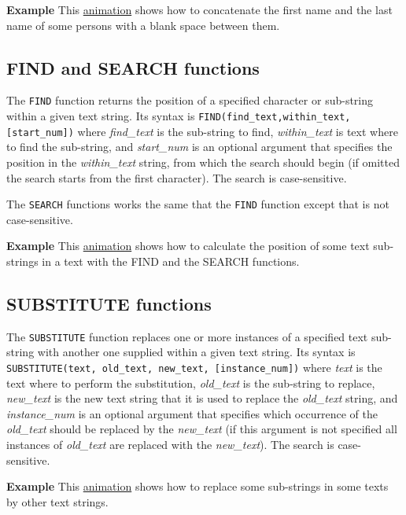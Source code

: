 \textbf{Example} This \href{http://aprendeconalf.es/office/excel/manual/img/example_function_concatenate.gif}{animation}
shows how to concatenate the first name and the last name of some persons with a blank space between them.


\subsection{FIND and SEARCH functions}\label{findandsearchfunctions}
The \texttt{FIND} function returns the position of a specified character or sub-string within a given text string. Its syntax is \texttt{FIND(find\_text,within\_text,[start\_num])} where \emph{find\_text} is the sub-string to find, \emph{within\_text} is text where to find the sub-string, and \emph{start\_num} is an optional argument that specifies the position in the \emph{within\_text} string, from which the search should begin (if omitted the search starts from the first character). The search is case-sensitive. 

The \texttt{SEARCH} functions works the same that the \texttt{FIND} function except that is not case-sensitive. 

\textbf{Example} This \href{http://aprendeconalf.es/office/excel/manual/img/example_function_find_search.gif}{animation}
shows how to calculate the position of some text sub-strings in a text with the FIND and the SEARCH functions.


\subsection{SUBSTITUTE functions}\label{substitutefunctions}
The \texttt{SUBSTITUTE} function replaces one or more instances of a specified text sub-string with another one supplied within a given text string. Its syntax is \texttt{SUBSTITUTE(text, old\_text, new\_text, [instance\_num])} where \emph{text} is the text where to perform the substitution, \emph{old\_text} is the sub-string to replace, \emph{new\_text} is the new text string that it is used to replace the \emph{old\_text} string, and \emph{instance\_num} is an optional argument that specifies which occurrence of the \emph{old\_text} should be replaced by the \emph{new\_text} (if this argument is not specified all instances of \emph{old\_text} are replaced with the \emph{new\_text}). The search is case-sensitive. 

\textbf{Example} This \href{http://aprendeconalf.es/office/excel/manual/img/example_function_substitute.gif}{animation}
shows how to replace some sub-strings in some texts by other text strings.


